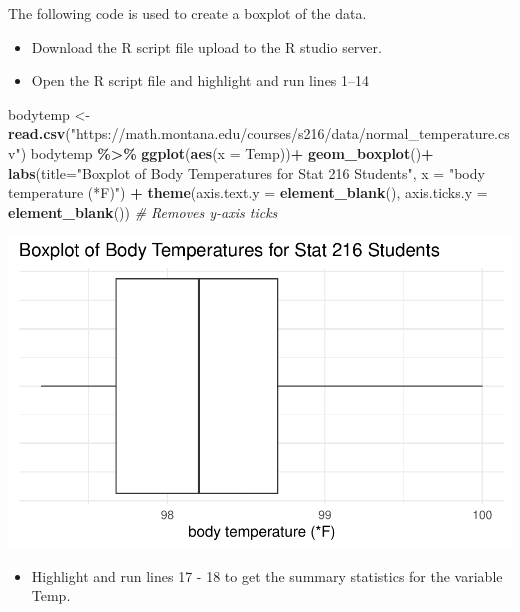 \documentclass[
]{report}
\newenvironment{Shaded}{\begin{snugshade}}{\end{snugshade}}
\newcommand{\AttributeTok}[1]{\textcolor[rgb]{0.13,0.29,0.53}{#1}}
\newcommand{\CommentTok}[1]{\textcolor[rgb]{0.56,0.35,0.01}{\textit{#1}}}
\newcommand{\FunctionTok}[1]{\textcolor[rgb]{0.13,0.29,0.53}{\textbf{#1}}}
\newcommand{\NormalTok}[1]{#1}
\newcommand{\OtherTok}[1]{\textcolor[rgb]{0.56,0.35,0.01}{#1}}
\newcommand{\SpecialCharTok}[1]{\textcolor[rgb]{0.81,0.36,0.00}{\textbf{#1}}}
\newcommand{\StringTok}[1]{\textcolor[rgb]{0.31,0.60,0.02}{#1}}
\providecommand{\tightlist}{%
  \setlength{\itemsep}{0pt}\setlength{\parskip}{0pt}}
\begin{document}
The following code is used to create a boxplot of the data.

\begin{itemize}
\item
  Download the R script file upload to the R studio server.
\item
  Open the R script file and highlight and run lines 1--14
\end{itemize}

\begin{Shaded}
\begin{Highlighting}[]
\NormalTok{bodytemp }\OtherTok{\textless{}{-}} \FunctionTok{read.csv}\NormalTok{(}\StringTok{"https://math.montana.edu/courses/s216/data/normal\_temperature.csv"}\NormalTok{)}
\NormalTok{bodytemp }\SpecialCharTok{\%\textgreater{}\%}
  \FunctionTok{ggplot}\NormalTok{(}\FunctionTok{aes}\NormalTok{(}\AttributeTok{x =}\NormalTok{ Temp))}\SpecialCharTok{+}
  \FunctionTok{geom\_boxplot}\NormalTok{()}\SpecialCharTok{+}
  \FunctionTok{labs}\NormalTok{(}\AttributeTok{title=}\StringTok{"Boxplot of Body Temperatures for Stat 216 Students"}\NormalTok{,}
       \AttributeTok{x =} \StringTok{"body temperature (*F)"}\NormalTok{) }\SpecialCharTok{+}
        \FunctionTok{theme}\NormalTok{(}\AttributeTok{axis.text.y =} \FunctionTok{element\_blank}\NormalTok{(), }
          \AttributeTok{axis.ticks.y =} \FunctionTok{element\_blank}\NormalTok{()) }\CommentTok{\# Removes y{-}axis ticks}
\end{Highlighting}
\end{Shaded}

\begin{center}\includegraphics[width=0.7\linewidth]{06-A13-quantitative_theory_files/figure-latex/unnamed-chunk-1-1} \end{center}

\begin{itemize}
\tightlist
\item
  Highlight and run lines 17 - 18 to get the summary statistics for the variable Temp.
\end{itemize}
\end{document}
